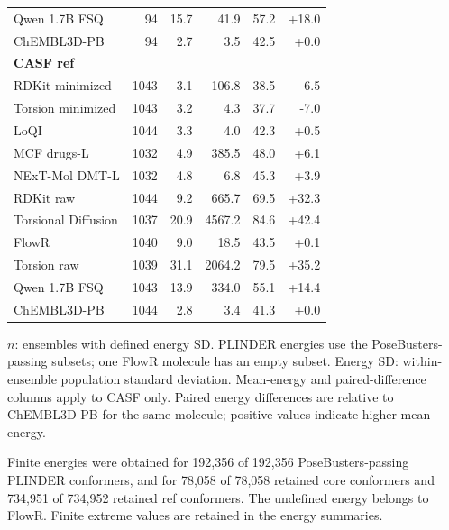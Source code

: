 \begin{table}[p]
\begin{tabular*}{\linewidth}{@{\extracolsep{\fill}}lrrrrr@{}}
Qwen 1.7B FSQ & 94 & 15.7 & 41.9 & 57.2 & +18.0 \\
\hdashline
ChEMBL3D-PB & 94 & 2.7 & 3.5 & 42.5 & +0.0 \\
\midrule
\multicolumn{6}{l}{\textbf{CASF ref}} \\
\midrule
RDKit minimized & 1043 & 3.1 & 106.8 & 38.5 & -6.5 \\
Torsion minimized & 1043 & 3.2 & 4.3 & 37.7 & -7.0 \\
LoQI & 1044 & 3.3 & 4.0 & 42.3 & +0.5 \\
MCF drugs-L & 1032 & 4.9 & 385.5 & 48.0 & +6.1 \\
NExT-Mol DMT-L & 1032 & 4.8 & 6.8 & 45.3 & +3.9 \\
RDKit raw & 1044 & 9.2 & 665.7 & 69.5 & +32.3 \\
Torsional Diffusion & 1037 & 20.9 & 4567.2 & 84.6 & +42.4 \\
FlowR & 1040 & 9.0 & 18.5 & 43.5 & +0.1 \\
Torsion raw & 1039 & 31.1 & 2064.2 & 79.5 & +35.2 \\
Qwen 1.7B FSQ & 1043 & 13.9 & 334.0 & 55.1 & +14.4 \\
\hdashline
ChEMBL3D-PB & 1044 & 2.8 & 3.4 & 41.3 & +0.0 \\
\bottomrule
\end{tabular*}
\par\smallskip
\begin{minipage}{\linewidth}
$n$: ensembles with defined energy SD. PLINDER energies use the PoseBusters-passing subsets; one FlowR molecule has an empty subset. Energy SD: within-ensemble population standard deviation. Mean-energy and paired-difference columns apply to CASF only. Paired energy differences are relative to ChEMBL3D-PB for the same molecule; positive values indicate higher mean energy.

Finite energies were obtained for 192,356 of 192,356 PoseBusters-passing PLINDER conformers, and for 78,058 of 78,058 retained core conformers and 734,951 of 734,952 retained ref conformers. The undefined energy belongs to FlowR. Finite extreme values are retained in the energy summaries.
\end{minipage}
\end{table}
